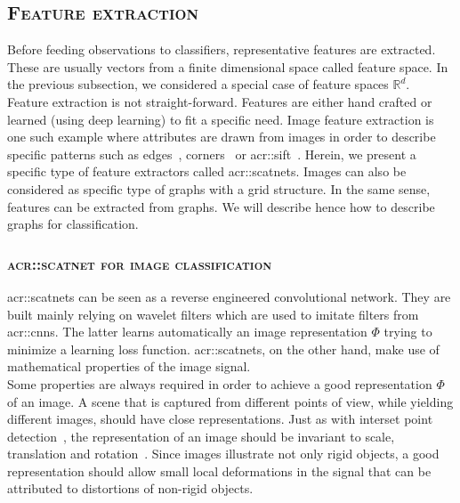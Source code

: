     \subsection{\textsc{Feature extraction}}
        \label{subsec::state_of_the_art::mlpr::feature_extraction}
            Before feeding observations to classifiers, representative features are extracted.
            These are usually vectors from a finite dimensional space called feature space.
            In the previous subsection, we considered a special case of feature spaces $\mathbb{R}^d$.\\

            Feature extraction is not straight-forward.
            Features are either hand crafted or learned (using deep learning) to fit a specific need.
            Image feature extraction is one such example where attributes are drawn from images in order to describe specific patterns such as edges~\parencite{canny1986computational}, corners~\parencite{harris1988combined} or \gls{acr::sift}~\parencite{lowe2004distinctive}.
            Herein, we present a specific type of feature extractors called \glspl{acr::scatnet}.
            Images can also be considered as specific type of graphs with a grid structure.
            In the same sense, features can be extracted from graphs.
            We will describe hence how to describe graphs for classification.

        \subsubsection{\textsc{\acrlong*{acr::scatnet} for image classification}}
            \glspl{acr::scatnet} can be seen as a reverse engineered convolutional network.
            They are built mainly relying on wavelet filters which are used to imitate filters from \glspl{acr::cnn}.
            The latter learns automatically an image representation $\Phi$ trying to minimize a learning loss function.
            \Glspl{acr::scatnet}, on the other hand, make use of mathematical properties of the image signal.\\

            Some properties are always required in order to achieve a good representation $\Phi$ of an image. 
            A scene that is captured from different points of view, while yielding different images, should have close representations.
            Just as with interset point detection~\parencite{lowe2004distinctive}, the representation of an image should be invariant to scale, translation and rotation~\parencite{mallat2012group,sifre2013rotation,bruna2013invariant}.
            Since images illustrate not only rigid objects, a good representation should allow small local deformations in the signal that can be attributed to distortions of non-rigid objects.\\


